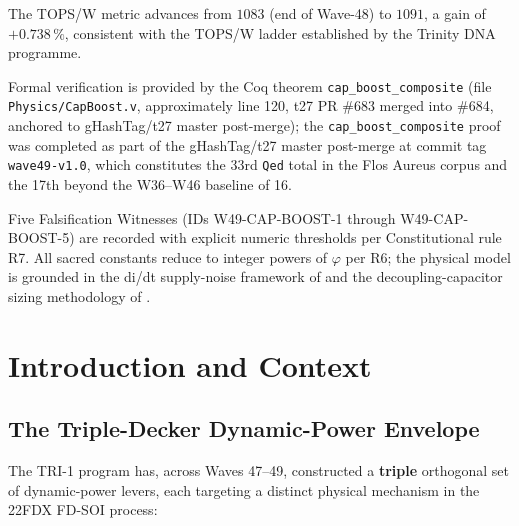 \documentclass[12pt,a4paper]{report}
\theoremstyle{plain}
\theoremstyle{definition}
\theoremstyle{remark}
\begin{document}
The TOPS/W metric advances from $1083$ (end of Wave-48) to $1091$,
a gain of $+0.738\,\%$, consistent with the TOPS/W ladder established by
the Trinity DNA programme.

Formal verification is provided by the Coq theorem \texttt{cap\_boost\_composite}
(file \texttt{Physics/CapBoost.v}, approximately line 120, t27 PR \#683
merged into \#684, anchored to gHashTag/t27 master post-merge);
the \texttt{cap\_boost\_composite} proof was completed as part of the
gHashTag/t27 master post-merge at commit tag \texttt{wave49-v1.0},
which constitutes the 33rd \texttt{Qed} total in the Flos Aureus corpus
and the 17th beyond the W36--W46 baseline of 16.

Five Falsification Witnesses (IDs W49-CAP-BOOST-1 through W49-CAP-BOOST-5)
are recorded with explicit numeric thresholds per Constitutional rule R7.
All sacred constants reduce to integer powers of $\varphi$ per R6; the
physical model is grounded in the di/dt supply-noise framework of
\citep{larsson_svensson_1994} and the decoupling-capacitor sizing methodology
of \citep{rabaey_2003}.

\section{Introduction and Context}
\label{sec:intro-w49}

\subsection{The Triple-Decker Dynamic-Power Envelope}
\label{ssec:triple-decker}

The TRI-1 program has, across Waves 47--49, constructed a \textbf{triple}
orthogonal set of dynamic-power levers, each targeting a distinct physical
mechanism in the 22FDX FD-SOI process:
\end{document}
